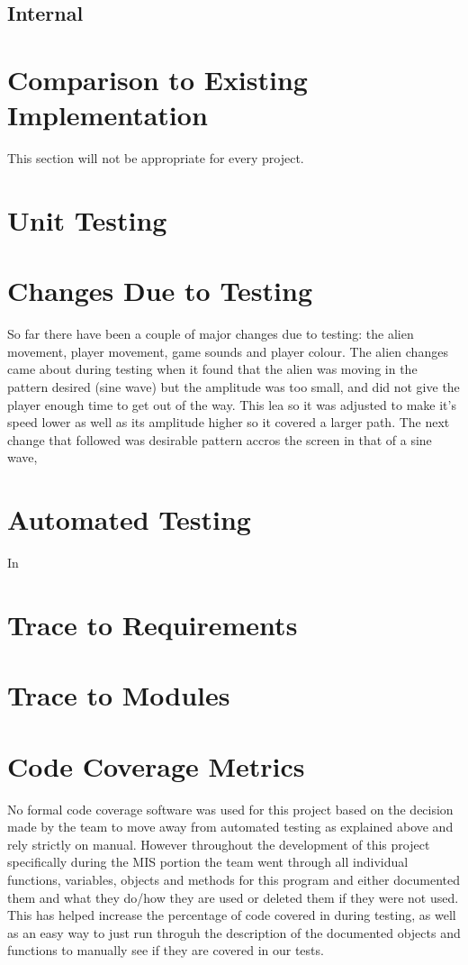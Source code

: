 \documentclass[12pt, titlepage]{article}
\begin{document}
\subsection{Internal}


\section{Comparison to Existing Implementation}

This section will not be appropriate for every project.

\section{Unit Testing}

\section{Changes Due to Testing}
So far there have been a couple of major changes due to testing: the alien movement, player movement, game sounds and player colour. The alien changes came about during testing when it found that the alien was moving in the pattern desired (sine wave) but the amplitude was too small, and did not give the player enough time to get out of the way. This lea so it was adjusted to make it's speed lower as well as its amplitude higher so it covered a larger path. The next change that followed was desirable pattern accros the screen in that of a sine wave,

\section{Automated Testing}
In

\section{Trace to Requirements}

\section{Trace to Modules}

\section{Code Coverage Metrics}
No formal code coverage software was used for this project based on the decision made by the team to move away from automated testing as explained above and rely strictly on manual. However throughout the development of this project specifically during the MIS portion the team went through all individual functions, variables, objects and methods for this program and either documented them and what they do/how they are used or deleted them if they were not used. This has helped increase the percentage of code covered in during testing, as well as an easy way to just run throguh the description of the documented objects and functions to manually see if they are covered in our tests.




\end{document}
